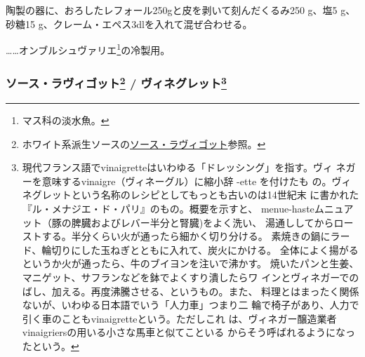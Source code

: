\begin{recette}

陶製の器に、おろしたレフォール250gと皮を剥いて刻んだくるみ250 g、塩5 g、
砂糖15 g、クレーム・エペス3dlを入れて混ぜ合わせる。

\ldots{}\ldots{}オンブルシュヴァリエ\footnote{マス科の淡水魚。}の冷製用。

\maeaki

\hypertarget{ux30bdux30fcux30b9ux30e9ux30f4ux30a3ux30b4ux30c3ux30c830-ux30f4ux30a3ux30cdux30b0ux30ecux30c3ux30c831}{%
\subsubsection[ソース・ラヴィゴット /
ヴィネグレット]{\texorpdfstring{ソース・ラヴィゴット\footnote{ホワイト系派生ソースの\protect\hyperlink{sauce-ravigote}{ソース・ラヴィゴット}参照。}
/ ヴィネグレット\footnote{現代フランス語でvinaigretteはいわゆる「ドレッシング」を指す。ヴィ
  ネガーを意味するvinaigre（ヴィネーグル）に縮小辞 -ette を付けたも
  の。ヴィネグレットという名称のレシピとしてもっとも古いのは14世紀末
  に書かれた『ル・メナジエ・ド・パリ』のもの。概要を示すと、
  menue-hasteムニュアット（豚の脾臓およびレバー半分と腎臓)をよく洗い、
  湯通ししてからローストする。半分くらい火が通ったら細かく切り分ける。
  素焼きの鍋にラード、輪切りにした玉ねぎとともに入れて、炭火にかける。
  全体によく揚がるというか火が通ったら、牛のブイヨンを注いで沸かす。
  焼いたパンと生姜、マニゲット、サフランなどを鉢でよくすり潰したらワ
  インとヴィネガーでのばし、加える。再度沸騰させる、というもの。また、
  料理とはまったく関係ないが、いわゆる日本語でいう「人力車」つまり二
  輪で椅子があり、人力で引く車のこともvinaigretteという。ただしこれ
  は、ヴィネガー醸造業者vinaigriersの用いる小さな馬車と似てこといる
  からそう呼ばれるようになったという。}}{ソース・ラヴィゴット / ヴィネグレット}}\label{ux30bdux30fcux30b9ux30e9ux30f4ux30a3ux30b4ux30c3ux30c830-ux30f4ux30a3ux30cdux30b0ux30ecux30c3ux30c831}}

\hypertarget{sauce-ravigote-froide}{%
}
\end{recette}
